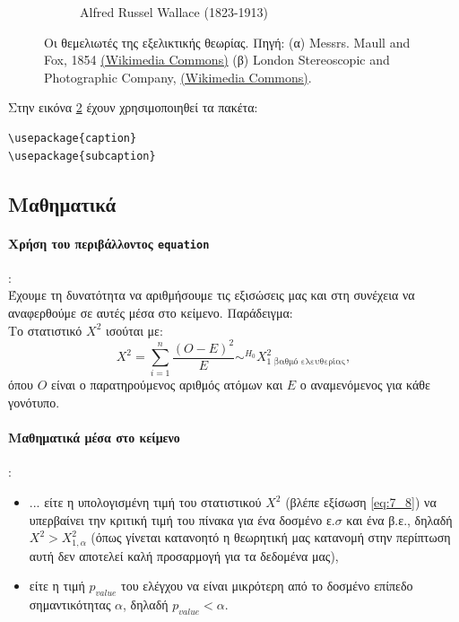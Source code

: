 \begin{refsection}
\begin{figure}
\begin{subfigure}{.5\textwidth}
  \caption{Alfred Russel Wallace (1823-1913)}
  \label{fig:sub2}
\end{subfigure}
\caption[Οι θεμελιωτές της εξελικτικής θεωρίας]{Οι θεμελιωτές της εξελικτικής θεωρίας. Πηγή: (α) Messrs. Maull and Fox, 1854 \href{https://commons.wikimedia.org/wiki/File:Charles_Darwin_seated_crop.jpg}{(Wikimedia Commons)}   (β) London Stereoscopic and Photographic Company, \href{https://commons.wikimedia.org/w/index.php?curid=27755581}{(Wikimedia Commons)}. }
\label{fig:double}
\end{figure}
Στην εικόνα \ref{fig:double} έχουν χρησιμοποιηθεί τα πακέτα:
\begin{verbatim}
\usepackage{caption}
\usepackage{subcaption}
\end{verbatim}
\subsection{Μαθηματικά}
\paragraph{Χρήση του περιβάλλοντος \texttt{equation}}:\\
Έχουμε τη δυνατότητα να αριθμήσουμε τις εξισώσεις μας και στη συνέχεια να αναφερθούμε σε αυτές
μέσα στο κείμενο. Παράδειγμα:\\
Το στατιστικό $X^{2}$ ισούται με:
\begin{equation}
\label{eq:7_8}
X^{2}=\sum_{i=1}^{n}\frac{(O-E)^{2}}{E}\sim^{H_{0}} X^{2}_{\mbox{1 βαθμό ελευθερίας}},
\end{equation}
όπου $O$ είναι ο παρατηρούμενος αριθμός ατόμων και $E$ ο αναμενόμενος για κάθε γονότυπο.
\paragraph{Μαθηματικά μέσα στο κείμενο}:
\begin{itemize}
\item ... είτε η υπολογισμένη τιμή του στατιστικού $X^{2}$ (βλέπε εξίσωση \ref{eq:7_8}) να υπερβαίνει την κριτική τιμή του πίνακα για ένα δοσμένο ε.$\sigma$ και ένα β.ε., δηλαδή $X^{2}> X^{2}_{1,\alpha}$ (όπως γίνεται κατανοητό η θεωρητική μας κατανομή στην περίπτωση αυτή δεν αποτελεί καλή προσαρμογή για τα δεδομένα μας),\newline
\item είτε η τιμή $p_{value}$ του ελέγχου να είναι μικρότερη από το δοσμένο επίπεδο σημαντικότητας $\alpha$, δηλαδή $p_{value} < \alpha$.
\end{itemize}


\end{refsection}

